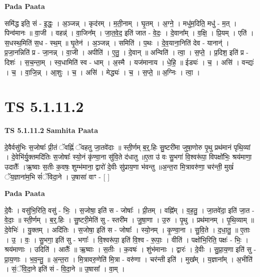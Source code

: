 \documentclass[17pt]{extarticle}
\begin{document}
\textbf{Pada Paata} \newline

समि॑द्ध इति॒ सं - इ॒द्धः॒ । अ॒ञ्जन्न् । कृद॑रम् । म॒ती॒नाम् । घृ॒तम् । अ॒ग्ने॒ । मधु॑म॒दिति॒ मधु॑ - म॒त् । पिन्व॑मानः ॥ वा॒जी । वहन्न्॑ । वा॒जिन᳚म् । जा॒त॒वे॒द॒ इति॑ जात - वे॒दः॒ । दे॒वाना᳚म् । व॒क्षि॒ । प्रि॒यम् । एति॑ । स॒धस्थ॒मिति॑ स॒ध - स्थ॒म् ॥ घृ॒तेन॑ । अ॒ञ्जन्न् । समिति॑ । प॒थः । दे॒व॒याना॒निति॑ देव - यानान्॑ । प्र॒जा॒नन्निति॑ प्र - जा॒नन्न् । वा॒जी । अपीति॑ । ए॒तु॒ । दे॒वान् ॥ अन्विति॑ । त्वा॒ । स॒प्ते॒ । प्र॒दिश॒ इति॑ प्र - दिशः॑ । स॒च॒न्ता॒म् । स्व॒धामिति॑ स्व - धाम् । अ॒स्मै । यज॑मानाय । धे॒हि॒ ॥ ईड्यः॑ । च॒ । असि॑ । वन्द्यः॑ । च॒ । वा॒जि॒न्न् । आ॒शुः । च॒ । असि॑ । मेद्ध्यः॑ । च॒ । स॒प्ते॒ ॥ अ॒ग्निः । त्वा॒ ।  \newline




\section*{ TS 5.1.11.2 }

\textbf{TS 5.1.11.2 } \newline
\textbf{Samhita Paata} \newline

दे॒वैर्वसु॑भिः स॒जोषाः᳚ प्री॒तं ॅवह्निं॑ ॅवहतु जा॒तवे॑दाः ॥ स्ती॒र्णम् ब॒र्॒.हिः सु॒ष्टरी॑मा जुषा॒णोरु पृ॒थु प्रथ॑मानं पृथि॒व्यां । दे॒वेभि॑र्यु॒क्तमदि॑तिः स॒जोषाः᳚ स्यो॒नं कृ॑ण्वा॒ना सु॑वि॒ते द॑धातु ॥ए॒ता उ॑ वः सु॒भगा॑ वि॒श्वरू॑पा॒ विपक्षो॑भिः॒ श्रय॑माणा॒ उदातैः᳚ ।ऋ॒ष्वाः स॒तीः क॒वषः॒ शुम्भ॑माना॒ द्वारो॑ दे॒वीः सु॑प्राय॒णा भ॑वन्तु ॥अ॒न्त॒रा मि॒त्रावरु॑णा॒ चर॑न्ती॒ मुखं॑ ॅय॒ज्ञाना॑म॒भि सं॑ॅविदा॒ने । उ॒षासा॑ वाꣳ - [  ] \newline

\textbf{Pada Paata} \newline

दे॒वैः । वसु॑भि॒रिति॒ वसु॑ - भिः॒ । स॒जोषा॒ इति॑ स - जोषाः᳚ । प्री॒तम् । वह्नि᳚म् । व॒ह॒तु॒ । जा॒तवे॑दा॒ इति॑ जा॒त - वे॒दाः॒ ॥ स्ती॒र्णम् । ब॒र्॒.हिः । सु॒ष्टरी॒मेति॑ सु - स्तरी॑म । जु॒षा॒णा । उ॒रु । पृ॒थु । प्रथ॑मानम् । पृ॒थि॒व्याम् ॥ दे॒वेभिः॑ । यु॒क्तम् । अदि॑तिः । स॒जोषा॒ इति॑ स - जोषाः᳚ । स्यो॒नम् । कृ॒ण्वा॒ना । सु॒वि॒ते । द॒धा॒तु॒ ॥ ए॒ताः । उ॒ । वः॒ । सु॒भगा॒ इति॑ सु - भगाः᳚ । वि॒श्वरू॑पा॒ इति॑ वि॒श्व - रू॒पाः॒ । वीति॑ । पक्षो॑भि॒रिति॒ पक्षः॑ - भिः॒ । श्रय॑माणाः । उदिति॑ । आतैः᳚ ॥ ऋ॒ष्वाः । स॒तीः । क॒वषः॑ । शुंभ॑मानाः । द्वारः॑ । दे॒वीः । सु॒प्रा॒य॒णा इति॑ सु - प्रा॒य॒णाः । भ॒व॒न्तु॒ ॥ अ॒न्त॒रा । मि॒त्रावरु॒णेति॑ मि॒त्रा - वरु॑णा । चर॑न्ती इति॑ । मुख᳚म् । य॒ज्ञाना᳚म् । अ॒भीति॑ । सं॒ॅवि॒दा॒ने इति॑ सं - वि॒दा॒ने ॥ उ॒षासा᳚ । वा॒म् ।  \newline
\end{document}
